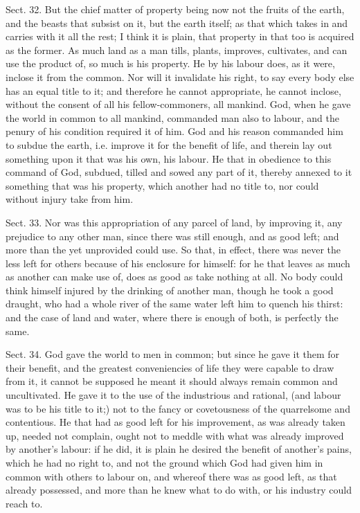 \documentclass[11pt,openany]{book}
\begin{document}
Sect. 32. But the chief matter of property being now not the fruits of the earth, and the beasts that subsist on it, but the earth itself; as that which takes in and carries with it all the rest; I think it is plain, that property in that too is acquired as the former. As much land as a man tills, plants, improves, cultivates, and can use the product of, so much is his property. He by his labour does, as it were, inclose it from the common. Nor will it invalidate his right, to say every body else has an equal title to it; and therefore he cannot appropriate, he cannot inclose, without the consent of all his fellow-commoners, all mankind. God, when he gave the world in common to all mankind, commanded man also to labour, and the penury of his condition required it of him. God and his reason commanded him to subdue the earth, i.e. improve it for the benefit of life, and therein lay out something upon it that was his own, his labour. He that in obedience to this command of God, subdued, tilled and sowed any part of it, thereby annexed to it something that was his property, which another had no title to, nor could without injury take from him.

Sect. 33. Nor was this appropriation of any parcel of land, by improving it, any prejudice to any other man, since there was still enough, and as good left; and more than the yet unprovided could use. So that, in effect, there was never the less left for others because of his enclosure for himself: for he that leaves as much as another can make use of, does as good as take nothing at all. No body could think himself injured by the drinking of another man, though he took a good draught, who had a whole river of the same water left him to quench his thirst: and the case of land and water, where there is enough of both, is perfectly the same.

Sect. 34. God gave the world to men in common; but since he gave it them for their benefit, and the greatest conveniencies of life they were capable to draw from it, it cannot be supposed he meant it should always remain common and uncultivated. He gave it to the use of the industrious and rational, (and labour was to be his title to it;) not to the fancy or covetousness of the quarrelsome and contentious. He that had as good left for his improvement, as was already taken up, needed not complain, ought not to meddle with what was already improved by another's labour: if he did, it is plain he desired the benefit of another's pains, which he had no right to, and not the ground which God had given him in common with others to labour on, and whereof there was as good left, as that already possessed, and more than he knew what to do with, or his industry could reach to.
\end{document}
